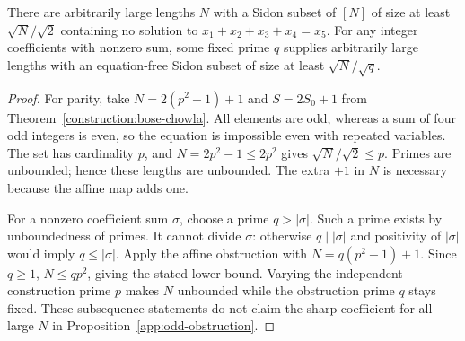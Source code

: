 \begin{lemma}
\label{construction:subsequence-obstructions}
\leanok
There are arbitrarily large lengths $N$ with a Sidon subset of $[N]$ of
size at least $\sqrt{N}/\sqrt2$ containing no solution to
$x_1+x_2+x_3+x_4=x_5$.
For any integer coefficients with nonzero sum, some fixed prime $q$
supplies arbitrarily large lengths with an equation-free Sidon subset of
size at least $\sqrt{N}/\sqrt q$.
\end{lemma}
\begin{proof}
For parity, take $N=2(p^2-1)+1$ and $S=2S_0+1$ from
Theorem~\ref{construction:bose-chowla}.  All elements are odd, whereas a
sum of four odd integers is even, so the equation is impossible even with
repeated variables.  The set has cardinality $p$, and
$N=2p^2-1\le2p^2$ gives $\sqrt N/\sqrt2\le p$.
Primes are unbounded; hence these lengths are unbounded.
The extra $+1$ in $N$ is necessary because the affine map adds one.

For a nonzero coefficient sum $\sigma$, choose a prime $q>|\sigma|$.
Such a prime exists by unboundedness of primes.  It cannot divide
$\sigma$: otherwise $q\mid|\sigma|$ and positivity of $|\sigma|$ would
imply $q\le|\sigma|$.  Apply the affine obstruction with
$N=q(p^2-1)+1$.  Since $q\ge1$, $N\le qp^2$, giving the stated lower
bound.  Varying the independent construction prime $p$ makes $N$
unbounded while the obstruction prime $q$ stays fixed.
These subsequence statements do not claim the sharp coefficient for all
large $N$ in Proposition~\ref{app:odd-obstruction}.
\end{proof}


